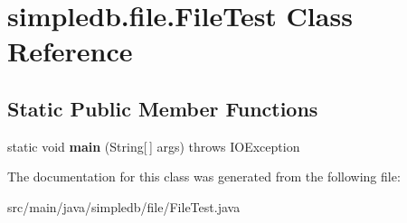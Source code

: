 \hypertarget{classsimpledb_1_1file_1_1FileTest}{}\section{simpledb.\+file.\+File\+Test Class Reference}
\label{classsimpledb_1_1file_1_1FileTest}
\subsection*{Static Public Member Functions}
\begin{DoxyCompactItemize}
\item 
\mbox{\label{classsimpledb_1_1file_1_1FileTest_ac2eaf57e5ae90ad53176aa91e9bf9209}} 
static void {\bfseries main} (String\mbox{[}$\,$\mbox{]} args)  throws I\+O\+Exception 
\end{DoxyCompactItemize}


The documentation for this class was generated from the following file\+:\begin{DoxyCompactItemize}
\item 
src/main/java/simpledb/file/File\+Test.\+java\end{DoxyCompactItemize}

